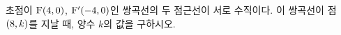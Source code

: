 초점이 $\mathrm{F}(4{,}\mkern3mu\mathopen{}0)$, $\mathrm{F}'(-4{,}\mkern3mu\mathopen{}0)$인 쌍곡선의 두 점근선이 서로 수직이다. 이 쌍곡선이 점~$(8{,}\mkern3mu\mathopen{}k)$를 지날 때, 양수 $k$의 값을 \mbox{구하시오.}
